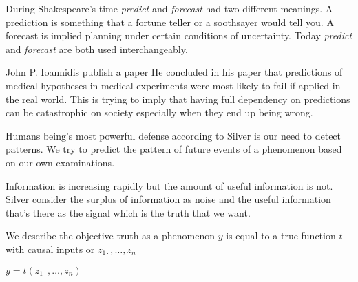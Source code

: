 \documentclass[12pt]{article}
\begin{document}

\begin{enumerate}


During Shakespeare's time \emph{predict} and \emph{forecast} had two different meanings. A prediction is something that a fortune teller or a soothsayer would tell you. A forecast is implied planning under certain conditions of uncertainty. Today \emph{predict} and \emph{forecast} are both used interchangeably. 


John P. Ioannidis publish a paper  He concluded in his paper that predictions of medical hypotheses in medical experiments were most likely to fail if applied in the real world. This is trying to imply that having full dependency on predictions can be catastrophic on society especially when they end up being wrong. 



Humans being's most powerful defense according to Silver is our need to detect patterns. We try to predict the pattern of future events of a phenomenon based on our own examinations. 


Information is increasing rapidly but the amount of useful information is not. Silver consider the surplus of information as noise and the useful information that's there as the signal which is the truth that we want.
\newpage
{}

We describe the objective truth as a phenomenon {$y$} is equal to a true function {${t}$} with causal inputs or  {$z_{1 \cdot}, \ldots, z _{n}$} 
\begin{center}
    {{$y = t(z_{1 \cdot}, \ldots, z _{n}) $}}
\end{center}



\end{enumerate}
\end{document}
